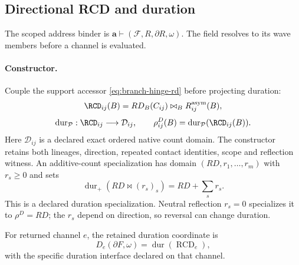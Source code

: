 
\subsection{Directional RCD and duration}
\label{sec:boundary-accounting}
\label{subsec:boundary-scope}
The scoped address binder is \(\mathbf a\vdash(\mathcal F,R,\partial R,\omega)\).
The field resolves to its wave members before a channel is evaluated.

\paragraph{Constructor.}
\label{subsec:reflection-duration-coupling}
Couple the support accessor \eqref{eq:branch-hinge-rd} before projecting duration:
\begin{equation}
\RCD_{ij}(B)=RD_B(C_{ij})\bowtie_B R^{\mathrm{asym}}_{ij}(B),
\label{eq:rcd-coupling}
\end{equation}
\begin{equation}
\operatorname{dur}_{\mathcal P}:\RCD_{ij}\longrightarrow\mathcal D_{ij},
\qquad \rho^D_{ij}(B)=\operatorname{dur}_{\mathcal P}(\RCD_{ij}(B)).
\label{eq:rcd-duration-participation}
\end{equation}
Here \(\mathcal D_{ij}\) is a declared exact ordered native count domain.
The constructor retains both lineages, direction, repeated contact identities,
scope and reflection witness. An additive-count specialization has domain
\((RD,r_1,\ldots,r_m)\) with \(r_s\ge0\) and sets
\begin{equation}
\operatorname{dur}_{+}(RD\bowtie(r_s)_s)=RD+\sum_s r_s.
\label{eq:rcd-additive-realization}
\end{equation}
This is a declared duration specialization. Neutral reflection \(r_s=0\)
specializes it to \(\rho^D=RD\); the \(r_s\) depend on direction,
so reversal can change duration.

For returned channel \(e\), the retained duration coordinate is
\begin{equation}
D_e(\partial F,\omega)=\operatorname{dur}(\operatorname{RCD}_e),
\label{eq:returned-duration}
\end{equation}
\label{subsec:returned-current-duration-coordinate}
with the specific duration interface declared on that channel.

